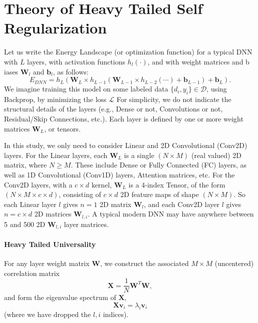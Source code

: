 
\section{Theory of Heavy Tailed Self Regularization}
\label{sxn:theory}


Let us write the Energy Landscape (or optimization function) for a typical DNN with $L$ layers, with activation functions $h_{l}(\cdot)$, and with weight matrices and b
iases $\mathbf{W}_{l}$ and $\mathbf{b}_{l}$, as follows:
\begin{equation}
E_{DNN}=h_{L}(\mathbf{W}_{L}\times h_{L-1}(\mathbf{W}_{L-1}\times h_{L-2}(\cdots)+\mathbf{b}_{L-1})+\mathbf{b}_{L})  .
\label{eqn:dnn_energy}
\end{equation}
We imagine training this model on some labeled data $\{d_{i},y_{i}\}\in\mathcal{D}$, using Backprop, by minimizing the loss $\mathcal{L}$
For simplicity, we do not indicate the structural details of the layers (e.g., Dense or not, Convolutions or not, Residual/Skip Connections, etc.). 
Each layer is defined by one or more weight matrices $\mathbf{W}_{L}$, or tensors.

In this study, we only need to  consider Linear and 2D Convolutional (Conv2D) layers. 
For the Linear layers, each $\mathbf{W}_{L}$ is a single $(N\times M)$ (real valued) 2D matrix, where $N\ge M$.
These include Dense or Fully Connected (FC) layers, as well as 1D Convolutional (Conv1D) layers, Attention matrices, etc.
For the Conv2D layers, with a $c\times d$ kernel, $\mathbf{W}_{L}$ is a 4-index Tensor, of the form $(N\times M \times c\times d)$, consisting
of $c\times d$ 2D feature maps of shape $(N\times M)$.   So each Linear layer $l$ gives $n=1$ 2D matrix $\mathbf{W}_{l}$, and each Conv2D layer $l$ gives $n=c\times d$ 2D matrices $\mathbf{W}_{l,i}$. A typical modern DNN may have anywhere between 5 and 500 2D $\mathbf{W}_{l,i}$ layer matrices.

\paragraph{Heavy Tailed Universality}

For any layer weight matrix $\mathbf{W}$, we construct the associated $M\times M$ (uncentered) correlation matrix
\begin{equation}
\mathbf{X} = \dfrac{1}{N}\mathbf{W}^{T}\mathbf{W}  ,
\label{eqn:unc_corr_mat}
\end{equation}
and form the eigenvalue spectrum of $\mathbf{X}$, 
$$
\mathbf{X}\mathbf{v}_{i}=\lambda_{i}\mathbf{v}_{i}
$$
(where we have dropped the $l,i$ indices).

